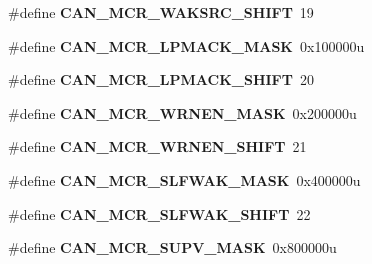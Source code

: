 \begin{DoxyCompactItemize}
\item 
\#define {\bfseries C\+A\+N\+\_\+\+M\+C\+R\+\_\+\+W\+A\+K\+S\+R\+C\+\_\+\+S\+H\+I\+FT}~19\hypertarget{group__CAN__Register__Masks_gafb165acf36a8a28e351cbaef2adb11b6}{}\label{group__CAN__Register__Masks_gafb165acf36a8a28e351cbaef2adb11b6}

\item 
\#define {\bfseries C\+A\+N\+\_\+\+M\+C\+R\+\_\+\+L\+P\+M\+A\+C\+K\+\_\+\+M\+A\+SK}~0x100000u\hypertarget{group__CAN__Register__Masks_ga599f0c162d665f019269aace68e3fb17}{}\label{group__CAN__Register__Masks_ga599f0c162d665f019269aace68e3fb17}

\item 
\#define {\bfseries C\+A\+N\+\_\+\+M\+C\+R\+\_\+\+L\+P\+M\+A\+C\+K\+\_\+\+S\+H\+I\+FT}~20\hypertarget{group__CAN__Register__Masks_ga3bd209cf2829ba4c96fc00ec18c6e2d6}{}\label{group__CAN__Register__Masks_ga3bd209cf2829ba4c96fc00ec18c6e2d6}

\item 
\#define {\bfseries C\+A\+N\+\_\+\+M\+C\+R\+\_\+\+W\+R\+N\+E\+N\+\_\+\+M\+A\+SK}~0x200000u\hypertarget{group__CAN__Register__Masks_ga235a7c2b04cfd0765fa2a9313fc1fcd1}{}\label{group__CAN__Register__Masks_ga235a7c2b04cfd0765fa2a9313fc1fcd1}

\item 
\#define {\bfseries C\+A\+N\+\_\+\+M\+C\+R\+\_\+\+W\+R\+N\+E\+N\+\_\+\+S\+H\+I\+FT}~21\hypertarget{group__CAN__Register__Masks_ga728f73a79721a9cc4b1b82ce6eaa74a7}{}\label{group__CAN__Register__Masks_ga728f73a79721a9cc4b1b82ce6eaa74a7}

\item 
\#define {\bfseries C\+A\+N\+\_\+\+M\+C\+R\+\_\+\+S\+L\+F\+W\+A\+K\+\_\+\+M\+A\+SK}~0x400000u\hypertarget{group__CAN__Register__Masks_gacf4f1d3d5d5eccf0f03f5f5ed4dc1bba}{}\label{group__CAN__Register__Masks_gacf4f1d3d5d5eccf0f03f5f5ed4dc1bba}

\item 
\#define {\bfseries C\+A\+N\+\_\+\+M\+C\+R\+\_\+\+S\+L\+F\+W\+A\+K\+\_\+\+S\+H\+I\+FT}~22\hypertarget{group__CAN__Register__Masks_ga8dc0878396e4d4e4b73deec9cf23b0b1}{}\label{group__CAN__Register__Masks_ga8dc0878396e4d4e4b73deec9cf23b0b1}

\item 
\#define {\bfseries C\+A\+N\+\_\+\+M\+C\+R\+\_\+\+S\+U\+P\+V\+\_\+\+M\+A\+SK}~0x800000u\hypertarget{group__CAN__Register__Masks_ga00521c6adbee738b0f73380052600203}{}\label{group__CAN__Register__Masks_ga00521c6adbee738b0f73380052600203}


\end{DoxyCompactItemize}
